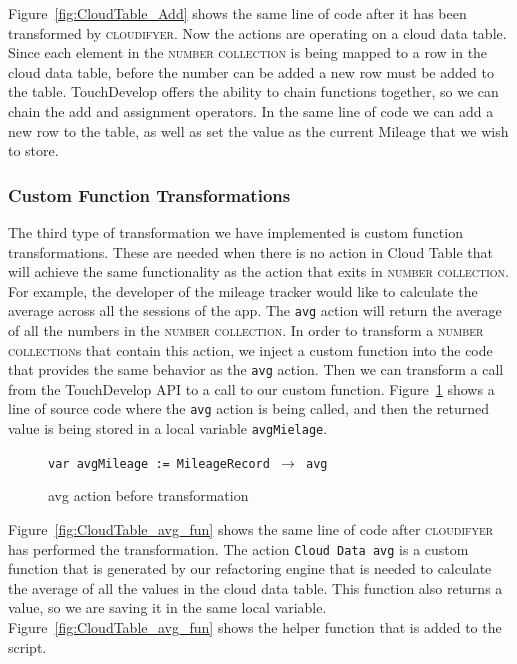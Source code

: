 \documentclass{sigplanconf}
\begin{document}
Figure~\ref{fig:CloudTable_Add} shows the same line of code after it has been transformed by  \textsc{cloudifyer}.  Now the actions are operating on a cloud data table.  Since each element in the \textsc{number collection} is being mapped to a row in the cloud data table, before the number can be added a new row must be added to the table.  TouchDevelop offers the ability to chain functions together, so we can chain the add and assignment operators.  In the same line of code we can add a new row to the table, as well as set the value as the current Mileage that we wish to store.


\subsubsection{Custom Function Transformations}
The third type of transformation we have implemented is custom function transformations.  These are needed when there is no action in Cloud Table that will achieve the same functionality as the action that exits in  \textsc{number collection}. For example, the developer of the mileage tracker would like to calculate the average across all the sessions of the app.  The \texttt{avg} action will return the average of all the numbers in the \textsc{number collection}.  In order to transform a \textsc{number collection}s that contain this action, we inject a custom function into the code that provides the same behavior as the \texttt{avg} action.  Then we can transform a call from the TouchDevelop API to a call to our custom function.  Figure~\ref{fig:numCol_avg} shows a line of source code where the \texttt{avg} action is being called, and then the returned value is being stored in a local variable \texttt{avgMielage}.


\begin{figure}[htbp!]
\begin{center}
\texttt{var avgMileage := MileageRecord $\rightarrow$ avg}
\nocaptionrule
\caption{avg action before transformation}
\label{fig:numCol_avg}
\end{center}
\end{figure}

Figure~\ref{fig:CloudTable_avg_fun} shows the same line of code after \textsc{cloudifyer} has performed the transformation.  The action \texttt{Cloud Data avg} is a custom function that is generated by our refactoring engine that is needed to calculate the average of all the values in the cloud data table.  This function also returns a value, so we are saving it in the same local variable.  Figure~\ref{fig:CloudTable_avg_fun} shows the helper function that is added to the script.
\end{document}
